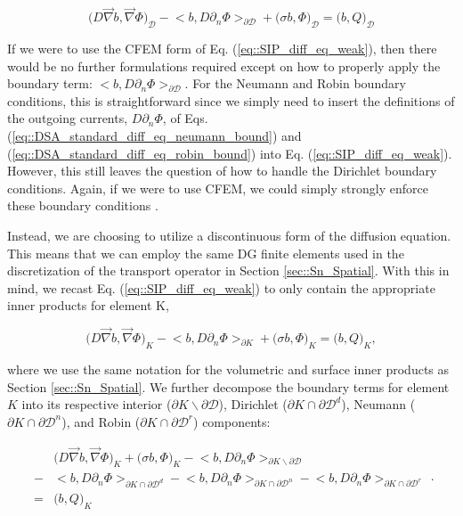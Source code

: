 \begin{equation}
\label{eq::SIP_diff_eq_weak}
\Big(  D \vec{\nabla}  b , \vec{\nabla} \Phi  \Big)_{\mathcal{D}} - \Big<  b, D \partial_n \Phi \Big>_{\partial \mathcal{D}} + \Big(  \sigma   b ,  \Phi  \Big)_{\mathcal{D}}  = \Big(  b, Q  \Big)_{\mathcal{D}}
\end{equation}

\noindent If we were to use the CFEM form of Eq. (\ref{eq::SIP_diff_eq_weak}), then there would be no further formulations required except on how to properly apply the boundary term: $\Big<  b, D \partial_n \Phi \Big>_{\partial \mathcal{D}}$. For the Neumann and Robin boundary conditions, this is straightforward since we simply need to insert the definitions of the outgoing currents, $ D \partial_n \Phi$, of Eqs. (\ref{eq::DSA_standard_diff_eq_neumann_bound}) and (\ref{eq::DSA_standard_diff_eq_robin_bound}) into Eq. (\ref{eq::SIP_diff_eq_weak}). However, this still leaves the question of how to handle the Dirichlet boundary conditions. Again, if we were to use CFEM, we could simply strongly enforce these boundary conditions \cite{akin1982application}.

Instead, we are choosing to utilize a discontinuous form of the diffusion equation. This means that we can employ the same DG finite elements used in the discretization of the transport operator in Section \ref{sec::Sn_Spatial}. With this in mind, we recast Eq. (\ref{eq::SIP_diff_eq_weak}) to only contain the appropriate inner products for element K,

\begin{equation}
\label{eq::SIP_diff_eq_weak_cellK}
\Big(  D \vec{\nabla}  b , \vec{\nabla} \Phi  \Big)_{K} - \Big<  b, D \partial_n \Phi \Big>_{\partial K} + \Big(  \sigma   b ,  \Phi  \Big)_{K}  = \Big(  b, Q  \Big)_{K} ,
\end{equation}

\noindent where we use the same notation for the volumetric and surface inner products as Section \ref{sec::Sn_Spatial}. We further decompose the boundary terms for element $K$ into its respective interior ($\partial K \backslash \partial \mathcal{D}$), Dirichlet ($\partial K \cap \partial \mathcal{D}^d$), Neumann ($\partial K \cap \partial \mathcal{D}^n$), and Robin ($\partial K \cap \partial \mathcal{D}^r$) components:

\begin{equation}
\label{eq::SIP_diff_eq_weak_cellK_wbounds}
\begin{aligned}
&\Big(  D \vec{\nabla}  b , \vec{\nabla} \Phi  \Big)_{K}  + \Big(  \sigma   b ,  \Phi  \Big)_{K}   - \Big<  b, D \partial_n \Phi \Big>_{\partial K \backslash \partial \mathcal{D}}   \\
 - &\Big<  b, D \partial_n \Phi \Big>_{\partial	K \cap \partial \mathcal{D}^d} - \Big<  b, D \partial_n \Phi \Big>_{\partial	K \cap \partial \mathcal{D}^n}  - \Big<  b, D \partial_n \Phi \Big>_{\partial	K \cap \partial \mathcal{D}^r} \\
= &\Big(  b, Q  \Big)_{K} 
\end{aligned} .
\end{equation}

